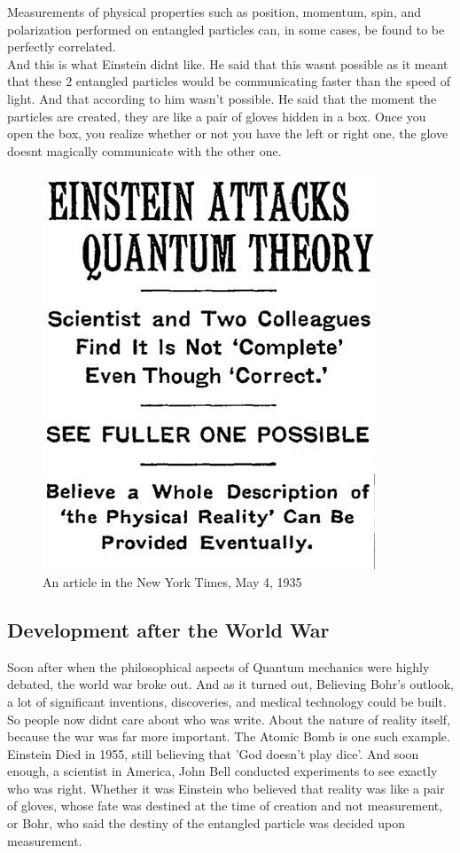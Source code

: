 \documentclass[11pt]{article}
\begin{document}
Measurements of physical properties such as position, momentum, spin, and polarization performed on entangled particles can, in some cases, be found to be perfectly correlated.\\ And this is what Einstein didnt like. He said that this wasnt possible as it meant that these 2 entangled particles would be communicating faster than the speed of light. And that according to him wasn't possible. He said that the moment the particles are created, they are like a pair of gloves hidden in a box. Once you open the box, you realize whether or not you have the left or right one, the glove doesnt magically communicate with the other one. 
\begin{figure}
	\centering
	\includegraphics[scale=0.4]{newspaper.jpg}
	\caption{An article in the New York Times, May 4, 1935}
\end{figure}

\subsection{Development after the World War}
Soon after when the philosophical aspects of Quantum mechanics were highly debated, the world war broke out. And as it turned out, Believing Bohr's outlook, a lot of significant inventions, discoveries, and medical technology could be built. So people now didnt care about who was write. About the nature of reality itself, because the war was far more important. The Atomic Bomb is one such example. Einstein Died in 1955, still believing that 'God doesn't play dice'. And soon enough, a scientist in America, John Bell conducted experiments to see exactly who was right. Whether it was Einstein who believed that reality was like a pair of gloves, whose fate was destined at the time of creation and not measurement, or Bohr, who said the destiny of the entangled particle was decided upon measurement. \\
\end{document}
